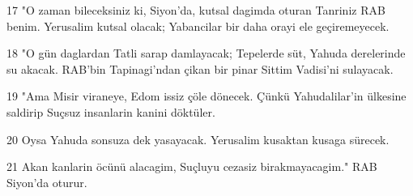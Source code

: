 \par 17 "O zaman bileceksiniz ki, Siyon'da, kutsal dagimda oturan Tanriniz RAB benim. Yerusalim kutsal olacak; Yabancilar bir daha orayi ele geçiremeyecek.
\par 18 "O gün daglardan Tatli sarap damlayacak; Tepelerde süt, Yahuda derelerinde su akacak. RAB'bin Tapinagi'ndan çikan bir pinar Sittim Vadisi'ni sulayacak.
\par 19 "Ama Misir viraneye, Edom issiz çöle dönecek. Çünkü Yahudalilar'in ülkesine saldirip Suçsuz insanlarin kanini döktüler.
\par 20 Oysa Yahuda sonsuza dek yasayacak. Yerusalim kusaktan kusaga sürecek.
\par 21 Akan kanlarin öcünü alacagim, Suçluyu cezasiz birakmayacagim." RAB Siyon'da oturur.


